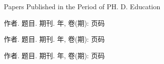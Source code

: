 {} {Papers
Published in the Period of PH. D. Education}

\begin{publist}
\item 作者. 题目. 期刊. 年, 卷(期): 页码

\item 作者. 题目. 期刊. 年, 卷(期): 页码

\item 作者. 题目. 期刊. 年, 卷(期): 页码
\end{publist}
